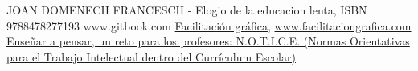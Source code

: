 \begin{thebibliography}{X}
  JOAN DOMENECH FRANCESCH - Elogio de la educacion lenta, ISBN 9788478277193
  www.gitbook.com 
   \href{www.facilitaciongrafica.com}{Facilitaci\'on gr\'afica,} \url{www.facilitaciongrafica.com} 
   \href{Garc\'ia Garc\'ia Luis Alberto}{Ense\~nar a pensar, un reto para los profesores: N.O.T.I.C.E. (Normas Orientativas para el Trabajo Intelectual dentro del Currículum Escolar)} 
\end{thebibliography}